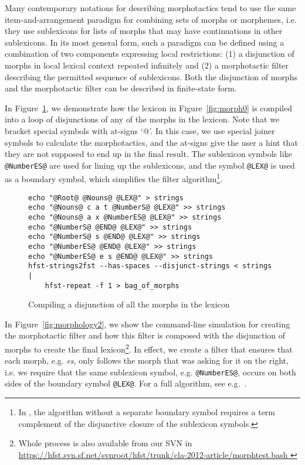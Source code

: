 \documentclass{llncs}
\begin{document}
Many contemporary notations for describing morphotactics tend to use the same item-and-arrangement paradigm for
combining sets of morphs or morphemes, i.e. they use sublexicons for lists of morphs that may 
have continuations in other sublexicons. 
In its most general form, such a paradigm can be defined using a combination of two components expressing local restrictions:
(1) a disjunction of morphs in local lexical context repeated infinitely and 
(2) a morphotactic filter describing the permitted sequence of sublexicons.
Both the disjunction of morphs and the morphotactic filter can be described in finite-state form.

In Figure~\ref{fig:morphology1}, we demonstrate how the lexicon in
Figure~\ref{fig:morph0} is compiled into a loop of disjunctions of any of the
morphs in the lexicon. Note that we bracket special symbols with at-signs `@'. In
this case, we use special joiner symbols to calculate the morphotactics, and the
at-signs give the user a hint that they are not supposed to end up in the final
result. The sublexicon symbols like \texttt{@NumberES@} are used for lining up 
the sublexicons, and the symbol \texttt{@LEX@} is used as a boundary symbol, which simplifies the filter
algorithm\footnote{In \cite{linden/2009/sfcm}, the algorithm without a separate
boundary symbol requires a term complement of the disjunctive closure of the sublexicon
symbols.}.

\begin{figure} [h!]
{\footnotesize
\begin{verbatim}
echo "@Root@ @Nouns@ @LEX@" > strings
echo "@Nouns@ c a t @NumberS@ @LEX@" >> strings
echo "@Nouns@ a x @NumberES@ @LEX@" >> strings
echo "@NumberS@ @END@ @LEX@" >> strings
echo "@NumberS@ s @END@ @LEX@" >> strings
echo "@NumberES@ @END@ @LEX@" >> strings
echo "@NumberES@ e s @END@ @LEX@" >> strings
hfst-strings2fst --has-spaces --disjunct-strings < strings  | 
    hfst-repeat -f 1 > bag_of_morphs

\end{verbatim}
}
\caption{Compiling a disjunction of all the morphs in the lexicon}
\label{fig:morphology1}
\end{figure}

In Figure~\ref{fig:morphology2}, we show the command-line simulation for
creating the morphotactic filter and how this filter is composed with the
disjunction of morphs to create the final lexicon\footnote{Whole process is
also available from our SVN in
\url{https://hfst.svn.sf.net/svnroot/hfst/trunk/cla-2012-article/morphtest.bash
}}. In effect, we create a filter
that ensures that each morph, e.g. \emph{es}, only follows the morph that
was asking for it on the right, i.e. we require that the same sublexicon symbol, e.g. \texttt{@NumberES@},
occurs on both sides of the boundary symbol \texttt{@LEX@}. For a full algorithm, see e.g.~\cite{linden/2009/sfcm}.
\end{document}
